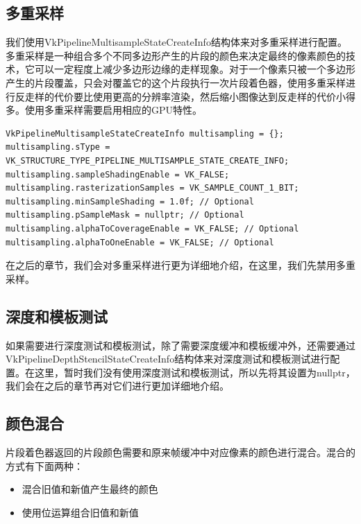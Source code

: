 \documentclass{ctexart}
\begin{document}
\subsection{多重采样}

我们使用VkPipelineMultisampleStateCreateInfo结构体来对多重采样进行配置。多重采样是一种组合多个不同多边形产生的片段的颜色来决定最终的像素颜色的技术，它可以一定程度上减少多边形边缘的走样现象。对于一个像素只被一个多边形产生的片段覆盖，只会对覆盖它的这个片段执行一次片段着色器，使用多重采样进行反走样的代价要比使用更高的分辨率渲染，然后缩小图像达到反走样的代价小得多。使用多重采样需要启用相应的GPU特性。

\begin{lstlisting}[language={[ANSI]C}]
VkPipelineMultisampleStateCreateInfo multisampling = {};
multisampling.sType = VK_STRUCTURE_TYPE_PIPELINE_MULTISAMPLE_STATE_CREATE_INFO;
multisampling.sampleShadingEnable = VK_FALSE;
multisampling.rasterizationSamples = VK_SAMPLE_COUNT_1_BIT;
multisampling.minSampleShading = 1.0f; // Optional
multisampling.pSampleMask = nullptr; // Optional
multisampling.alphaToCoverageEnable = VK_FALSE; // Optional
multisampling.alphaToOneEnable = VK_FALSE; // Optional
\end{lstlisting}

在之后的章节，我们会对多重采样进行更为详细地介绍，在这里，我们先禁用多重采样。

\subsection{深度和模板测试}

如果需要进行深度测试和模板测试，除了需要深度缓冲和模板缓冲外，还需要通过VkPipelineDepthStencilStateCreateInfo结构体来对深度测试和模板测试进行配置。在这里，暂时我们没有使用深度测试和模板测试，所以先将其设置为nullptr，我们会在之后的章节再对它们进行更加详细地介绍。

\subsection{颜色混合}

片段着色器返回的片段颜色需要和原来帧缓冲中对应像素的颜色进行混合。混合的方式有下面两种：

\begin{itemize}
	\item 混合旧值和新值产生最终的颜色
	\item 使用位运算组合旧值和新值
\end{itemize}
\end{document}

